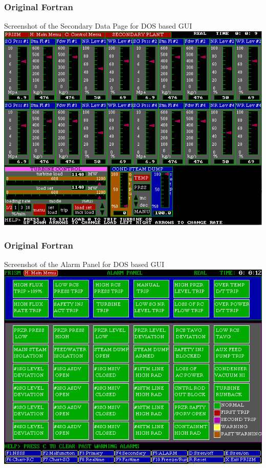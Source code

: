 \documentclass[fleqn]{beamer}
\begin{document}
    \begin{frame}
        \frametitle{Original Fortran}
        \begin{center}
            Screenshot of the Secondary Data Page for DOS based GUI 
            \includegraphics[totalheight=.8\textheight]{prism4}
        \end{center}
    \end{frame}
    
    \begin{frame}
        \frametitle{Original Fortran}
        \begin{center}
            Screenshot of the Alarm Panel for DOS based GUI 
            \includegraphics[totalheight=.8\textheight]{prism5}
        \end{center}
    \end{frame}
    
\end{document}
